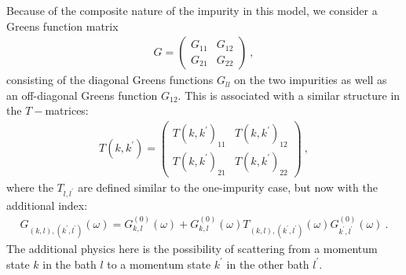 Because of the composite nature of the impurity in this model, we consider a Greens function matrix
\begin{equation}\begin{aligned}
	G = \begin{pmatrix} G_{11} & G_{12} \\ G_{21} & G_{22} \end{pmatrix}~,
\end{aligned}\end{equation}
consisting of the diagonal Greens functions \(G_{ll}\) on the two impurities as well as an off-diagonal Greens function \(G_{12}\). This is associated with a similar structure in the \(T-\)matrices:
\begin{equation}\begin{aligned}
	T(k,k^\prime) = \begin{pmatrix} T(k,k^\prime)_{11} & T(k,k^\prime)_{12} \\ T(k,k^\prime)_{21} & T(k,k^\prime)_{22} \end{pmatrix}~,
\end{aligned}\end{equation}
where the \(T_{l,l^\prime}\) are defined similar to the one-impurity case, but now with the additional index:
\begin{equation}\begin{aligned}\label{greensTmatrix2I}
	G_{(k,l),(k^\prime,l^\prime)}(\omega) = G^{(0)}_{k,l}(\omega) + G^{(0)}_{k,l}(\omega)T_{(k,l),(k^\prime,l^\prime)}(\omega) G^{(0)}_{k^\prime,l^\prime}(\omega)~.
\end{aligned}\end{equation}
The additional physics here is the possibility of scattering from a momentum state \(k\) in the bath \(l\) to a momentum state \(k^\prime\) in the other bath \(l^\prime\).

